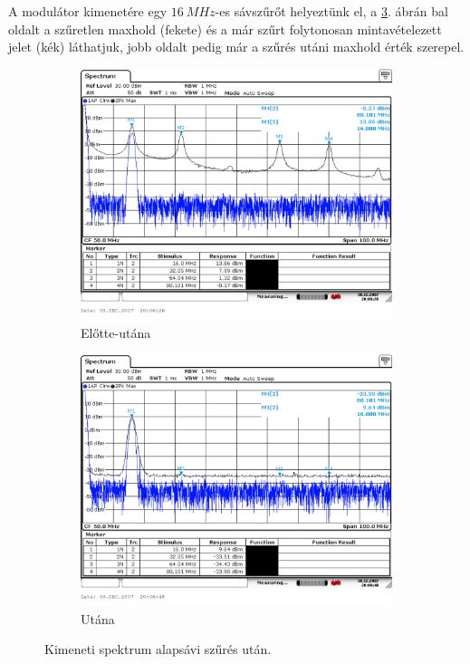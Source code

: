 A modulátor kimenetére egy $\SI{16}{MHz}$-es sávszűrőt helyeztünk el, a \ref{fig:modulator_szures}. ábrán bal oldalt a szűretlen maxhold (fekete) és a már szűrt folytonosan mintavételezett jelet (kék) láthatjuk, jobb oldalt pedig már a szűrés utáni maxhold érték szerepel.

\begin{figure}[H]
	\centering
	\begin{subfigure}[b]{0.49\textwidth}
		\includegraphics[width=\textwidth,keepaspectratio]{kepek/A_csop_006.PNG}
		\caption{Előtte-utána}
		\label{fig:modulator_szures_elotte}
	\end{subfigure}
	\begin{subfigure}[b]{0.49\textwidth}
		\includegraphics[width=\textwidth,keepaspectratio]{kepek/A_csop_007.PNG}
		\caption{Utána}
		\label{fig:modulator_szures_utana}
	\end{subfigure}
	\caption{Kimeneti spektrum alapsávi szűrés után.}
	\label{fig:modulator_szures}
\end{figure}


